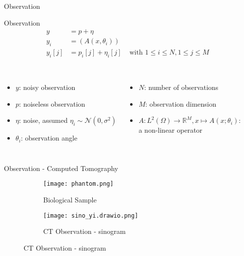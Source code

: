 \begin{frame}{Observation}

    \begin{block}{Observation}
        \begin{equation}
            \begin{aligned}
                y &= p + \eta \\
                y_i &= \left( A(x, \theta_i) \right) \\
                y_i[j] &= p_i[j] + \eta_i[j] & \text{ with } 1 \leq i \leq N, 1 \leq j \leq M  \\
            \end{aligned}
        \end{equation}

    \end{block}

    \begin{columns}[T]

    \begin{itemize}
        \item $y$: noisy observation
        \item $p$: noiseless observation
        \item $\eta$: noise, assumed  $\eta_i \sim \mathcal{N}(0,\sigma^2)$
        \item $\theta_i$: observation angle
    \end{itemize}
        

    \begin{itemize}

        \item $N$: number of observations
        \item $M$: observation dimension
        \item $A: L^2(\Omega) \to \mathbb{R}^M, x \mapsto A(x; \theta_i)$: \\a non-linear operator 
    \end{itemize}

    \end{columns}
\end{frame}

\begin{frame}{Observation - Computed Tomography }

    \begin{figure}
    \centering
    \begin{subfigure}{0.4\textwidth}
        \texttt{[image: phantom.png]}
        \caption{Biological Sample}
    \end{subfigure}
    \begin{subfigure}{0.4\textwidth}
        \texttt{[image: sino\_yi.drawio.png]}
        \caption{CT Observation - sinogram}
    \end{subfigure}
\end{figure}

\end{frame}


